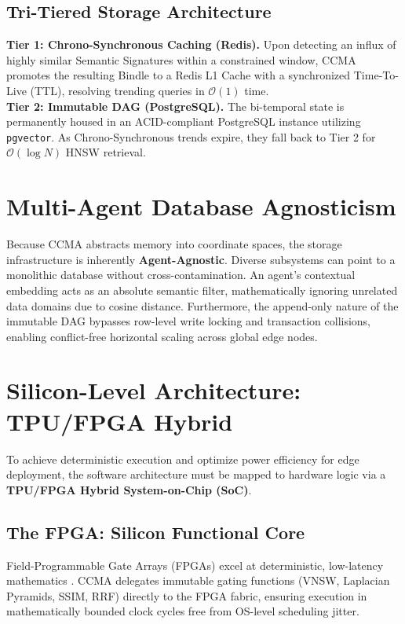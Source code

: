 \documentclass[11pt, a4paper]{article}
\begin{document}
	\subsection{Tri-Tiered Storage Architecture}
	\textbf{Tier 1: Chrono-Synchronous Caching (Redis).} Upon detecting an influx of highly similar Semantic Signatures within a constrained window, CCMA promotes the resulting Bindle to a Redis L1 Cache with a synchronized Time-To-Live (TTL), resolving trending queries in $\mathcal{O}(1)$ time.\\
	\textbf{Tier 2: Immutable DAG (PostgreSQL).} The bi-temporal state is permanently housed in an ACID-compliant PostgreSQL instance utilizing \texttt{pgvector}. As Chrono-Synchronous trends expire, they fall back to Tier 2 for $\mathcal{O}(\log N)$ HNSW retrieval.
	
	\section{Multi-Agent Database Agnosticism}
	Because CCMA abstracts memory into coordinate spaces, the storage infrastructure is inherently \textbf{Agent-Agnostic}. Diverse subsystems can point to a monolithic database without cross-contamination. An agent's contextual embedding acts as an absolute semantic filter, mathematically ignoring unrelated data domains due to cosine distance. Furthermore, the append-only nature of the immutable DAG bypasses row-level write locking and transaction collisions, enabling conflict-free horizontal scaling across global edge nodes.
	
	\section{Silicon-Level Architecture: TPU/FPGA Hybrid}
	To achieve deterministic execution and optimize power efficiency for edge deployment, the software architecture must be mapped to hardware logic via a \textbf{TPU/FPGA Hybrid System-on-Chip (SoC)}.
	
	\subsection{The FPGA: Silicon Functional Core}
	Field-Programmable Gate Arrays (FPGAs) excel at deterministic, low-latency mathematics \cite{nurvitadhi2017fpga}. CCMA delegates immutable gating functions (VNSW, Laplacian Pyramids, SSIM, RRF) directly to the FPGA fabric, ensuring execution in mathematically bounded clock cycles free from OS-level scheduling jitter.
	
\end{document}
